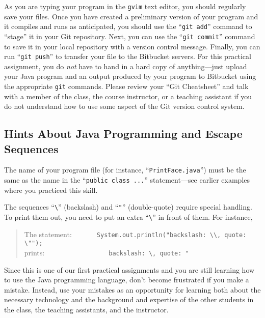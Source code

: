 As you are typing your program in the {\tt gvim} text editor, you should regularly save your files.  Once you have
created a preliminary version of your program and it compiles and runs as anticipated, you should use the ``{\tt git
add}'' command to ``stage'' it in your Git repository.  Next, you can use the ``{\tt git commit}'' command to save it in
your local repository with a version control message.  Finally, you can run ``{\tt git push}'' to transfer your file to
the Bitbucket servers.  For this practical assignment, you do {\em not} have to hand in a hard copy of anything---just
upload your Java program and an output produced by your program to Bitbucket using the appropriate {\tt git} commands.
Please review your ``Git Cheatsheet'' and talk with a member of the class, the course instructor, or a teaching
assistant if you do not understand how to use some aspect of the Git version control system.

\vspace*{-.1in}
\subsection*{Hints About Java Programming and Escape Sequences}
\vspace*{-.05in}

The name of your program file (for instance, ``{\tt PrintFace.java}'') must be the same as the name in the ``{\tt public
  class ...}'' statement---see earlier examples where you practiced this skill.

The sequences ``\verb$\$'' (backslash) and ``\verb$"$'' (double-quote)
require special handling. To print them out, you need to put an extra
``\verb$\$'' in front of them. For instance,

\vspace*{-.1in}
\begin{quote}
The statement:\ \ \ \ \ \ \ \verb$System.out.println("backslash: \\, quote: \"");$\\
prints:\ \ \ \ \ \ \ \ \ \ \ \ \ \ \ \ \ \
\verb$backslash: \, quote: "$
\end{quote}
\vspace*{-.1in}

Since this is one of our first practical assignments and you are still learning how to use the Java programming
language, don't become frustrated if you make a mistake. Instead, use your mistakes as an opportunity for learning both
about the necessary technology and the background and expertise of the other students in the class, the teaching
assistants, and the instructor.

